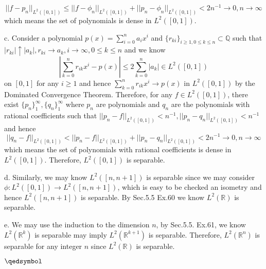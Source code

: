 \documentclass[lang=en,11pt,a4paper,citestyle =authoryear]{elegantpaper}
\newcommand{\prvd}{$\hfill \qedsymbol$}
\newcommand{\R}{\mathbb{R}}
\newcommand{\Q}{\mathbb{Q}}
\begin{document}
\[||f - p_n||_{L^2([0,1])} \leq ||f-\phi_n||_{L^2([0,1])}+||p_n-\phi_n||_{L^2([0,1])} < 2n^{-1} \to 0, n\to\infty\]
which means the set of polynomials is dense in $L^2([0,1])$.\par
c. Consider a polynomial $p(x) = \sum\limits_{i=0}^n a_ix^i$ and $\{r_{ki}\}_{i\geq 1, 0\leq k \leq n}\subset \Q$ such that $|r_{ki}| \uparrow |a_k|, r_{ki} \to a_k, i\to\infty, 0\leq k \leq n$ and we know
\[|\sum\limits_{k=0}^n r_{ik} x^i - p(x)| \leq 2\sum\limits_{k=0}^n |a_k| \in L^2([0,1])\]
on $[0,1]$ for any $i\geq 1$ and hence $\sum\limits_{k=0}^n r_{ik} x^i \to p(x)$ in $L^2([0,1])$ by the Dominated Convergence Theorem. Therefore, for any $f\in L^2([0,1])$, there exist $\{p_n\}_1^{\infty}, \{q_n\}_1^{\infty}$ where $p_n$ are polynomials and $q_n$ are the polynomials with rational coefficients such that $||p_n-f||_{L^2([0,1])} < n^{-1},||p_n-q_n||_{L^2([0,1])} < n^{-1}$ and hence 
\[||q_n-f||_{L^2([0,1])} <||p_n-f||_{L^2([0,1])} + ||p_n-q_n||_{L^2([0,1])} < 2n^{-1} \to 0,n\to\infty\]
which means the set of polynomials with rational coefficients is dense in $L^2([0,1])$. Therefore, $L^2([0,1])$ is separable.\par
d. Similarly, we may know $L^2([n,n+1])$ is separable since we may consider $\phi: L^2([0,1])\to L^2([n,n+1])$, which is easy to be checked an isometry and hence $L^2([n,n+1])$ is separable. By Sec.5.5 Ex.60 we know $L^2(\R)$ is separable.\par
e. We may use the induction to the dimension $n$, by Sec.5.5. Ex.61, we know $L^2(\R^k)$ is separable may imply $L^2(\R^{k+1})$ is separable. Therefore, $L^2(\R^n)$ is separable for any integer $n$ since $L^2(\R)$ is separable.

\prvd
\vspace{0.5em}

\addappheadtotoc
\end{document}
